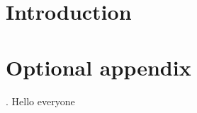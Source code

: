 \documentclass[12pt]{report}
\begin{document}

\tableofcontents


\chapter{Introduction}


\appendix
\chapter{Optional appendix}

\citep{abbeel_apprenticeship_2004}. Hello everyone

\printbibliography
\end{document}
